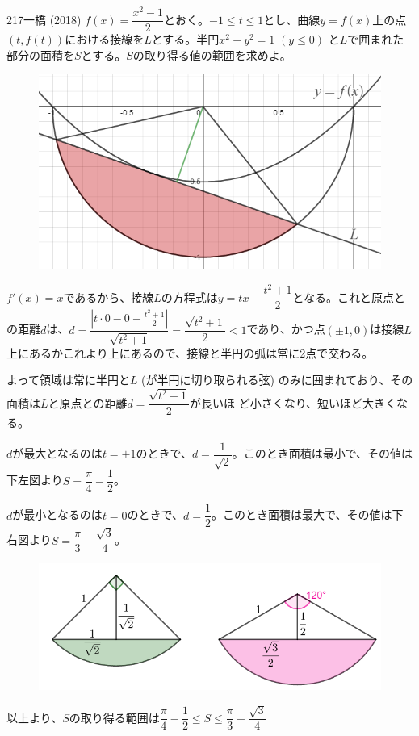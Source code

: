 \begin{thm}{217}{}{一橋 (2018)}
 $f(x)=\dfrac{x^2-1}{2}$とおく。$-1\le t \le 1$とし、曲線$y=f(x)$上の点$\left(t,f(t)\right)$における接線を$L$とする。半円$x^2+y^2=1$ $(y\le 0)$ と$L$で囲まれた部分の面積を$S$とする。$S$の取り得る値の範囲を求めよ。
\end{thm}

\begin{figure}[H]
 \centering
 \includegraphics[width=0.7\linewidth]{../problems/Q_217/A_217.png}
\end{figure}

$f'(x)=x$であるから、接線$L$の方程式は$y=tx-\dfrac{t^2+1}{2}$となる。これと原点との距離$d$は、$d=\dfrac{\left|t\cdot 0-0-\frac{t^2+1}{2}\right|}{\sqrt{t^2+1}}=\dfrac{\sqrt{t^2+1}}{2} < 1$であり、かつ点$(\pm1, 0)$は接線$L$上にあるかこれより上にあるので、接線と半円の弧は常に2点で交わる。

よって領域は常に半円と$L$ (が半円に切り取られる弦) のみに囲まれており、その面積は$L$と原点との距離$d=\dfrac{\sqrt{t^2+1}}{2}$が長いほ
ど小さくなり、短いほど大きくなる。

$d$が最大となるのは$t=\pm 1$のときで、$d=\dfrac{1}{\sqrt{2}}$。このとき面積は最小で、その値は下左図より$S=\dfrac{\pi}{4}-\dfrac{1}{2}$。

$d$が最小となるのは$t=0$のときで、$d=\dfrac{1}{2}$。このとき面積は最大で、その値は下右図より$S=\dfrac{\pi}{3}-\dfrac{\sqrt{3}}{4}$。

\begin{figure}[H]
 \centering
 \includegraphics[width=0.6\linewidth]{../problems/Q_217/A_217_2.png}
\end{figure}

以上より、$S$の取り得る範囲は$\dfrac{\pi}{4}-\dfrac{1}{2}\le S \le \dfrac{\pi}{3}-\dfrac{\sqrt{3}}{4}$